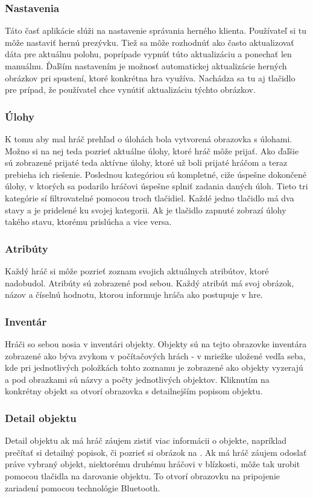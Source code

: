 \subsubsection{Nastavenia}
Táto časť aplikácie slúži na nastavenie správania herného klienta. Používateľ si tu môže nastaviť hernú prezývku. Tiež sa môže rozhodnúť ako často aktualizovať dáta pre aktuálnu polohu, poprípade vypnúť túto aktualizáciu a ponechať len manuálnu. Ďaľším nastavením je možnosť automatickej aktualizácie herných obrázkov pri spustení, ktoré konkrétna hra využíva. Nachádza sa tu aj tlačidlo pre prípad, že používatel chce vynútiť aktualizáciu týchto obrázkov.

\subsubsection{Úlohy}
K tomu aby mal hráč prehľad o úlohách bola vytvorená obrazovka s úlohami. Možno si na nej teda pozrieť aktuálne úlohy, ktoré hráč môže prijať. Ako ďaľšie sú zobrazené prijaté teda aktívne úlohy, ktoré už boli prijaté hráčom a teraz prebieha ich riešenie. Poslednou kategóriou sú kompletné, ciže úspešne dokončené úlohy, v ktorých sa podarilo hráčovi úspešne splniť zadania daných úloh. Tieto tri kategórie sí filtrovatelné pomocou troch tlačidiel. Každé jedno tlačidlo má dva stavy a je pridelené ku svojej kategorii. Ak je tlačidlo zapnuté zobrazí úlohy takého stavu, ktorému prislúcha a vice versa.

\subsubsection{Atribúty}
Každý hráč si môže pozrieť zoznam svojich aktuálnych atribútov, ktoré nadobudol. Atribúty sú zobrazené pod sebou. Každý atribút má svoj obrázok, názov a číselnú hodnotu, ktorou informuje hráča ako postupuje v hre.

\subsubsection{Inventár}
Hráči so sebou nosia v inventári objekty. Objekty sú na tejto obrazovke inventára zobrazené ako býva zvykom v počítačových hrách - v mriežke uložené vedľa seba, kde pri jednotlivých položkách tohto zoznamu je zobrazené ako objekty vyzerajú a pod obrazkami sú názvy a počty jednotlivých objektov. Kliknutím na konkrétny objekt sa otvorí obrazovka s detailnejším popisom objektu.

\subsubsection{Detail objektu}
Detail objektu  ak má hráč záujem zistiť viac informácii o objekte, napríklad prečítať si detailný popisok, či pozrieť si obrázok na . Ak má hráč záujem odoslať práve vybraný objekt, niektorému druhému hráčovi v blízkosti, môže tak urobit pomocou tlačidla na darovanie objektu. To otvorí obrazovku na pripojenie zariadení pomocou technológie Bluetooth.

